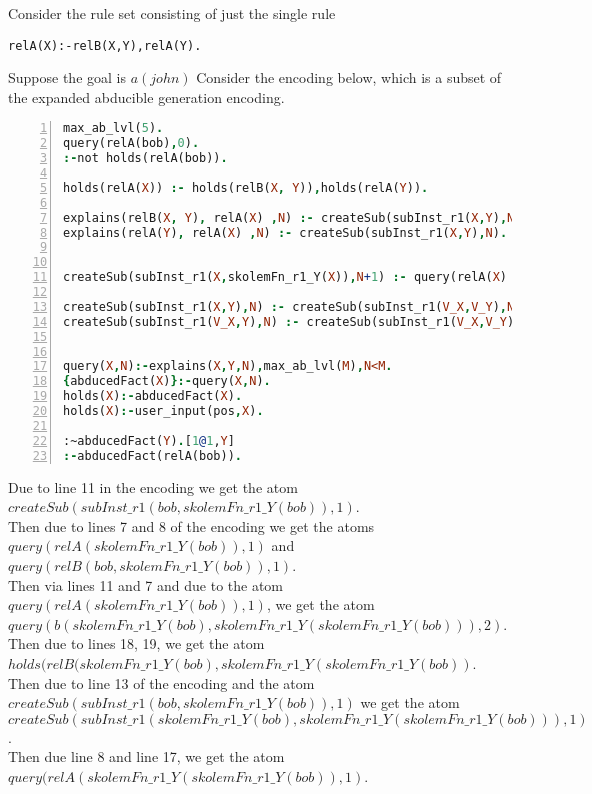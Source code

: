 \documentclass{article}
\begin{document}
Consider the rule set consisting of just the single rule \begin{verbatim}
relA(X):-relB(X,Y),relA(Y).
\end{verbatim}
Suppose the goal is $a(john)$
Consider the encoding below, which is a subset of the expanded abducible generation encoding.
\begin{lstlisting}[language=Prolog, numbers=left]
max_ab_lvl(5).
query(relA(bob),0).
:-not holds(relA(bob)).

holds(relA(X)) :- holds(relB(X, Y)),holds(relA(Y)).

explains(relB(X, Y), relA(X) ,N) :- createSub(subInst_r1(X,Y),N).
explains(relA(Y), relA(X) ,N) :- createSub(subInst_r1(X,Y),N).


createSub(subInst_r1(X,skolemFn_r1_Y(X)),N+1) :- query(relA(X) ,N),max_ab_lvl(M),N<M-1.

createSub(subInst_r1(X,Y),N) :- createSub(subInst_r1(V_X,V_Y),N), holds(relB(X, Y)).
createSub(subInst_r1(V_X,Y),N) :- createSub(subInst_r1(V_X,V_Y),N),holds(relA(Y)).


query(X,N):-explains(X,Y,N),max_ab_lvl(M),N<M.
{abducedFact(X)}:-query(X,N).
holds(X):-abducedFact(X).
holds(X):-user_input(pos,X).

:~abducedFact(Y).[1@1,Y]
:-abducedFact(relA(bob)).
\end{lstlisting}

Due to line 11 in the encoding we get the atom $createSub(subInst\_r1(bob,skolemFn\_r1\_Y(bob)),1)$.\\
Then due to lines 7 and 8 of the encoding we get the atoms $query(relA(skolemFn\_r1\_Y(bob)),1)$ and $query(relB(bob,skolemFn\_r1\_Y(bob)),1)$.\\

Then via lines 11 and 7 and due to the atom $query(relA(skolemFn\_r1\_Y(bob)),1)$, we get the atom $query(b(skolemFn\_r1\_Y(bob), skolemFn\_r1\_Y(skolemFn\_r1\_Y(bob))),2)$. \\

Then due to lines 18, 19, we get the atom $holds(relB(skolemFn\_r1\_Y(bob), skolemFn\_r1\_Y(skolemFn\_r1\_Y(bob))$.\\

Then due to line 13 of the encoding and the atom $createSub(subInst\_r1(bob,skolemFn\_r1\_Y(bob)),1)$ we get the atom $createSub(subInst\_r1(skolemFn\_r1\_Y(bob), skolemFn\_r1\_Y(skolemFn\_r1\_Y(bob))),1)$. \\

Then due line 8 and line 17, we get the atom $query(relA(skolemFn\_r1\_Y(skolemFn\_r1\_Y(bob)),1)$.\\
\end{document}
